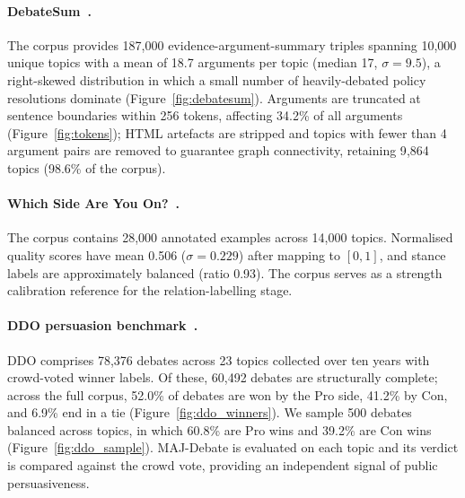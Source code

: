\documentclass[11pt,twocolumn,letterpaper]{article}
\newcommand{\DebateSumTopics}{10{,}000}
\newcommand{\DebateSumArgs}{187{,}000}
\newcommand{\WhichSideTopics}{14{,}000}
\newcommand{\WhichSideArgs}{28{,}000}
\newcommand{\TruncLimit}{256}
\newcommand{\MinArgPairs}{4}
\newcommand{\AptMean}{18.7}
\newcommand{\AptMedian}{17}
\newcommand{\AptStd}{9.5}
\newcommand{\NTopicsKept}{9{,}864}
\newcommand{\PctTopicsKept}{98.6}
\newcommand{\PctArgsTrunc}{34.2}
\newcommand{\QualityMean}{0.506}
\newcommand{\QualityStd}{0.229}
\newcommand{\StanceBalance}{0.93}
\newcommand{\DDOTotal}{78{,}376}
\newcommand{\DDOTopics}{23}
\newcommand{\DDOSample}{500}
\newcommand{\DDOComplete}{60{,}492}
\newcommand{\DDOProWin}{52.0}
\newcommand{\DDOConWin}{41.2}
\newcommand{\DDOTie}{6.9}
\newcommand{\DDOSamplePro}{60.8}
\newcommand{\DDOSampleCon}{39.2}
\begin{document}
\paragraph{DebateSum~\citep{roush2020debatesum}.}
The corpus provides \DebateSumArgs{} evidence-argument-summary
triples spanning \DebateSumTopics{} unique topics with a mean of
\AptMean{} arguments per topic (median \AptMedian{},
$\sigma=\AptStd$), a right-skewed distribution in which a small
number of heavily-debated policy resolutions dominate
(Figure~\ref{fig:debatesum}). Arguments are truncated at sentence
boundaries within \TruncLimit{} tokens, affecting \PctArgsTrunc\%
of all arguments (Figure~\ref{fig:tokens}); HTML artefacts are
stripped and topics with fewer than \MinArgPairs{} argument pairs
are removed to guarantee graph connectivity, retaining
\NTopicsKept{} topics (\PctTopicsKept\% of the corpus).

\paragraph{Which Side Are You On?~\citep{li2024whichside}.}
The corpus contains \WhichSideArgs{} annotated examples across
\WhichSideTopics{} topics. Normalised quality scores have mean
\QualityMean{} ($\sigma=\QualityStd$) after mapping to $[0,1]$, and
stance labels are approximately balanced (ratio \StanceBalance).
The corpus serves as a strength calibration reference for the
relation-labelling stage.

\paragraph{DDO persuasion benchmark~\citep{durmus2019ddo}.}
DDO comprises \DDOTotal{} debates across \DDOTopics{} topics
collected over ten years with crowd-voted winner labels. Of these,
\DDOComplete{} debates are structurally complete; across the full
corpus, \DDOProWin\% of debates are won by the Pro side,
\DDOConWin\% by Con, and \DDOTie\% end in a tie
(Figure~\ref{fig:ddo_winners}). We sample \DDOSample{} debates
balanced across topics, in which \DDOSamplePro\% are Pro wins and
\DDOSampleCon\% are Con wins (Figure~\ref{fig:ddo_sample}).
MAJ-Debate is evaluated on each topic and its verdict is compared
against the crowd vote, providing an independent signal of public
persuasiveness.
\end{document}
